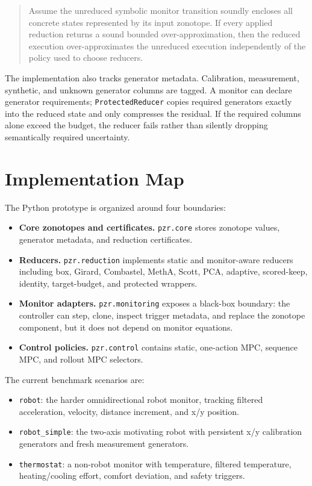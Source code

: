 \documentclass[11pt]{article}
\begin{document}
\begin{quote}
Assume the unreduced symbolic monitor transition soundly encloses all concrete
states represented by its input zonotope. If every applied reduction returns a
sound bounded over-approximation, then the reduced execution over-approximates
the unreduced execution independently of the policy used to choose reducers.
\end{quote}

The implementation also tracks generator metadata. Calibration, measurement,
synthetic, and unknown generator columns are tagged. A monitor can declare
generator requirements; \texttt{ProtectedReducer} copies required generators
exactly into the reduced state and only compresses the residual. If the required
columns alone exceed the budget, the reducer fails rather than silently
dropping semantically required uncertainty.

\section{Implementation Map}

The Python prototype is organized around four boundaries:

\begin{itemize}
\item \textbf{Core zonotopes and certificates.} \texttt{pzr.core} stores
zonotope values, generator metadata, and reduction certificates.
\item \textbf{Reducers.} \texttt{pzr.reduction} implements static and
monitor-aware reducers including box, Girard, Combastel, MethA, Scott, PCA,
adaptive, scored-keep, identity, target-budget, and protected wrappers.
\item \textbf{Monitor adapters.} \texttt{pzr.monitoring} exposes a black-box
boundary: the controller can step, clone, inspect trigger metadata, and replace
the zonotope component, but it does not depend on monitor equations.
\item \textbf{Control policies.} \texttt{pzr.control} contains static,
one-action MPC, sequence MPC, and rollout MPC selectors.
\end{itemize}

The current benchmark scenarios are:

\begin{itemize}
\item \texttt{robot}: the harder omnidirectional robot monitor, tracking
filtered acceleration, velocity, distance increment, and x/y position.
\item \texttt{robot\_simple}: the two-axis motivating robot with persistent
x/y calibration generators and fresh measurement generators.
\item \texttt{thermostat}: a non-robot monitor with temperature, filtered
temperature, heating/cooling effort, comfort deviation, and safety triggers.
\end{itemize}
\end{document}
